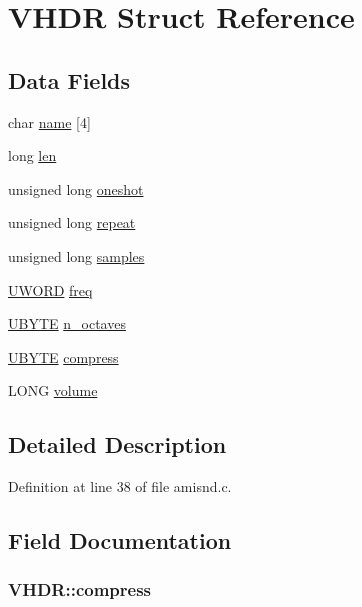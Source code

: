 \hypertarget{structVHDR}{\section{V\+H\+D\+R Struct Reference}
\label{structVHDR}
}
\subsection*{Data Fields}
\begin{DoxyCompactItemize}
\item 
char \hyperlink{structVHDR_aa4f94382f4d8457e1a0347381cd177ca}{name} \mbox{[}4\mbox{]}
\item 
long \hyperlink{structVHDR_ac9b8a37622e9b8463c7960ad41e50156}{len}
\item 
unsigned long \hyperlink{structVHDR_a089b7a9807d70fd3d3ecf3aee73f0bdb}{oneshot}
\item 
unsigned long \hyperlink{structVHDR_a6f7ae2c860bb3158b73bfd5dc687453d}{repeat}
\item 
unsigned long \hyperlink{structVHDR_a7a18a51c2ae695acc4be0c2a8507b8eb}{samples}
\item 
\hyperlink{bitmfile_8h_a0428171499a4ab7aebc2bf058ae337df}{U\+W\+O\+R\+D} \hyperlink{structVHDR_a5a183e685d444a2ae9faa5db8017fccf}{freq}
\item 
\hyperlink{bitmfile_8h_aa068c7f96c3fdd66282567bcb068db80}{U\+B\+Y\+T\+E} \hyperlink{structVHDR_ac1d13306727d8320558518754ccf4f3b}{n\+\_\+octaves}
\item 
\hyperlink{bitmfile_8h_aa068c7f96c3fdd66282567bcb068db80}{U\+B\+Y\+T\+E} \hyperlink{structVHDR_a5f0a6c8eac280b8b096f86a12007d400}{compress}
\item 
L\+O\+N\+G \hyperlink{structVHDR_a0af145fc440467469fe9bf80fd7ea1aa}{volume}
\end{DoxyCompactItemize}


\subsection{Detailed Description}


Definition at line 38 of file amisnd.\+c.



\subsection{Field Documentation}
\hypertarget{structVHDR_a5f0a6c8eac280b8b096f86a12007d400}{
\subsubsection[{compress}]{ V\+H\+D\+R\+::compress}}\label{structVHDR_a5f0a6c8eac280b8b096f86a12007d400}


